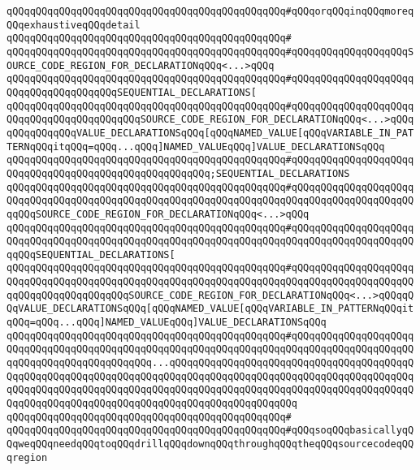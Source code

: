 \verb|qQQqqQQqqQQqqQQqqQQqqQQqqQQqqQQqqQQqqQQqqQQqqQQq#qQQqorqQQqinqQQqmoreqQQqexhaustiveqQQqdetail|\newline
\verb|qQQqqQQqqQQqqQQqqQQqqQQqqQQqqQQqqQQqqQQqqQQqqQQq#|\newline
\verb|qQQqqQQqqQQqqQQqqQQqqQQqqQQqqQQqqQQqqQQqqQQqqQQq#qQQqqQQqqQQqqQQqqQQqSOURCE_CODE_REGION_FOR_DECLARATIONqQQq<...>qQQq|\newline
\verb|qQQqqQQqqQQqqQQqqQQqqQQqqQQqqQQqqQQqqQQqqQQqqQQq#qQQqqQQqqQQqqQQqqQQqqQQqqQQqqQQqqQQqqQQqSEQUENTIAL_DECLARATIONS[|\newline
\verb|qQQqqQQqqQQqqQQqqQQqqQQqqQQqqQQqqQQqqQQqqQQqqQQq#qQQqqQQqqQQqqQQqqQQqqQQqqQQqqQQqqQQqqQQqqQQqSOURCE_CODE_REGION_FOR_DECLARATIONqQQq<...>qQQqqQQqqQQqqQQqVALUE_DECLARATIONSqQQq[qQQqNAMED_VALUE[qQQqVARIABLE_IN_PATTERNqQQqitqQQq=qQQq...qQQq]NAMED_VALUEqQQq]VALUE_DECLARATIONSqQQq|\newline
\verb|qQQqqQQqqQQqqQQqqQQqqQQqqQQqqQQqqQQqqQQqqQQqqQQq#qQQqqQQqqQQqqQQqqQQqqQQqqQQqqQQqqQQqqQQqqQQqqQQqqQQqqQQq;SEQUENTIAL_DECLARATIONS|\newline
\verb|qQQqqQQqqQQqqQQqqQQqqQQqqQQqqQQqqQQqqQQqqQQqqQQq#qQQqqQQqqQQqqQQqqQQqqQQqqQQqqQQqqQQqqQQqqQQqqQQqqQQqqQQqqQQqqQQqqQQqqQQqqQQqqQQqqQQqqQQqqQQqqQQqSOURCE_CODE_REGION_FOR_DECLARATIONqQQq<...>qQQq|\newline
\verb|qQQqqQQqqQQqqQQqqQQqqQQqqQQqqQQqqQQqqQQqqQQqqQQq#qQQqqQQqqQQqqQQqqQQqqQQqqQQqqQQqqQQqqQQqqQQqqQQqqQQqqQQqqQQqqQQqqQQqqQQqqQQqqQQqqQQqqQQqqQQqqQQqSEQUENTIAL_DECLARATIONS[|\newline
\verb|qQQqqQQqqQQqqQQqqQQqqQQqqQQqqQQqqQQqqQQqqQQqqQQq#qQQqqQQqqQQqqQQqqQQqqQQqqQQqqQQqqQQqqQQqqQQqqQQqqQQqqQQqqQQqqQQqqQQqqQQqqQQqqQQqqQQqqQQqqQQqqQQqqQQqqQQqqQQqqQQqSOURCE_CODE_REGION_FOR_DECLARATIONqQQq<...>qQQqqQQqVALUE_DECLARATIONSqQQq[qQQqNAMED_VALUE[qQQqVARIABLE_IN_PATTERNqQQqitqQQq=qQQq...qQQq]NAMED_VALUEqQQq]VALUE_DECLARATIONSqQQq|\newline
\verb|qQQqqQQqqQQqqQQqqQQqqQQqqQQqqQQqqQQqqQQqqQQqqQQq#qQQqqQQqqQQqqQQqqQQqqQQqqQQqqQQqqQQqqQQqqQQqqQQqqQQqqQQqqQQqqQQqqQQqqQQqqQQqqQQqqQQqqQQqqQQqqQQqqQQqqQQqqQQqqQQqqQQq...qQQqqQQqqQQqqQQqqQQqqQQqqQQqqQQqqQQqqQQqqQQqqQQqqQQqqQQqqQQqqQQqqQQqqQQqqQQqqQQqqQQqqQQqqQQqqQQqqQQqqQQqqQQqqQQqqQQqqQQqqQQqqQQqqQQqqQQqqQQqqQQqqQQqqQQqqQQqqQQqqQQqqQQqqQQqqQQqqQQqqQQqqQQqqQQqqQQqqQQqqQQqqQQqqQQqqQQqqQQqqQQqqQQqqQQq|\newline
\verb|qQQqqQQqqQQqqQQqqQQqqQQqqQQqqQQqqQQqqQQqqQQqqQQq#|\newline
\verb|qQQqqQQqqQQqqQQqqQQqqQQqqQQqqQQqqQQqqQQqqQQqqQQq#qQQqsoqQQqbasicallyqQQqweqQQqneedqQQqtoqQQqdrillqQQqdownqQQqthroughqQQqtheqQQqsourcecodeqQQqregion|\newline
